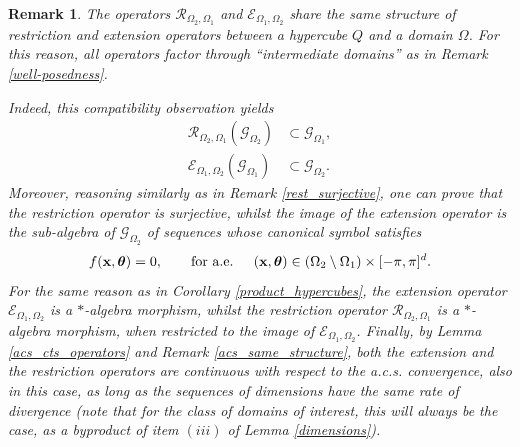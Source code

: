 \documentclass[10pt,a4paper]{amsart}
\newtheorem{rem}{Remark}
\newcommand{\bftheta}{{\boldsymbol\theta}}
\begin{document}
\begin{rem}
The operators $\mathcal{R}_{\Omega_2,\Omega_1}$ and $\mathcal{E}_{\Omega_1,\Omega_2}$ share the same structure of restriction and extension operators between a hypercube $Q$ and a domain $\Omega$. For this reason, all operators factor through ``intermediate domains'' as in Remark \ref{well-posedness}.

Indeed, this compatibility observation yields
\begin{align*}
    \mathcal{R}_{\Omega_2,\Omega_1}(\mathcal{G}_{\Omega_2})&\subset\mathcal{G}_{\Omega_1},\\
    \mathcal{E}_{\Omega_1,\Omega_2}(\mathcal{G}_{\Omega_1})&\subset\mathcal{G}_{\Omega_2}.
\end{align*}
Moreover, reasoning similarly as in Remark \ref{rest_surjective}, one can prove that the restriction operator is surjective, whilst the image of the extension operator is the sub-algebra of $\mathcal{G}_{\Omega_2}$ of sequences whose canonical symbol satisfies 
\begin{equation*}
        f(\bfx,\bftheta)=0,\qquad \text{for a.e. }\quad(\bfx,\bftheta)\in (\Omega_2\setminus \Omega_1)\times[-\pi,\pi]^d.
    \end{equation*}
For the same reason as in Corollary \ref{product_hypercubes}, the extension operator $\mathcal{E}_{\Omega_1,\Omega_2}$ is a $*$-algebra morphism, whilst the restriction operator $\mathcal{R}_{\Omega_2,\Omega_1}$ is a $*$-algebra morphism, when restricted to the image of $\mathcal{E}_{\Omega_1,\Omega_2}$.
Finally, by Lemma \ref{acs_cts_operators} and Remark \ref{acs_same_structure}, both the extension and the restriction operators are continuous with respect to the a.c.s. convergence, also in this case, as long as the sequences of dimensions have the same rate of divergence (note that for the class of domains of interest, this will always be the case, as a byproduct of item $(iii)$ of Lemma \ref{dimensions}).
\end{rem}
\end{document}
